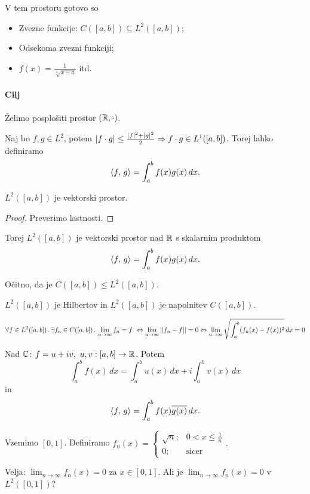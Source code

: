 V tem prostoru gotovo so 
\begin{itemize}
    \item Zvezne funkcije: \(C([a,b]) \subseteq L^2([a,b])\);
    \item Odsekoma zvezni funkciji;
    \item \(f(x) = \frac{1}{\sqrt[4]{x-a}}\) itd.
\end{itemize}

\newpage
\paragraph{Cilj} Želimo posplošiti prostor \((\mathbb{R}, \cdot)\).

Naj bo \(f, g \in L^2\), potem \(|f \cdot g| \leq \frac{|f|^2 + |g|^2}{2} \Rightarrow f \cdot g \in L^1([a, b])\). Torej lahko definiramo 
\[\left\langle f, \, g \right\rangle = \int_{a}^{b}f(x)g(x) \, dx.\]

\begin{trditev}
    \(L^2([a,b])\) je vektorski prostor.
\end{trditev}

\begin{proof}
    Preverimo lastnosti.
\end{proof}

Torej \(L^2([a, b])\) je vektorski prostor nad \(\mathbb{R}\) s skalarnim produktom \[\left\langle f, \, g \right\rangle = \int_{a}^{b}f(x)g(x) \, dx.\]

Očitno, da je \(C([a,b]) \leq L^2([a, b])\).

\begin{izrek}
    \(L^2([a,b])\) je Hilbertov in \(L^2([a,b])\) je napolnitev \(C([a,b])\).
\end{izrek}

\begin{opomba}
    \[\forall f \in L^2([a,b]) \,.\, \exists f_n \in C([a,b]) \,.\, \lim_{n \to \infty}  f_n = f\ \Leftrightarrow \lim_{n \to \infty} ||f_n - f|| = 0 \Leftrightarrow \lim_{n \to \infty} \sqrt{\int_{a}^{b}(f_n(x) - f(x))^2} \, dx = 0\]
\end{opomba}

\begin{opomba}
    Nad \(\mathbb{C}\): \(f = u + iv, \ u, v: [a, b] \to \mathbb{R}\). Potem 
    \[\int_{a}^{b}f(x) \, dx = \int_{a}^{b}u(x) \, dx + i\int_{a}^{b}v(x) \, dx \]
    in 
    \[\left\langle f, \, g \right\rangle = \int_{a}^{b}f(x) \overline{g(x)} \, dx.\]
\end{opomba}

\begin{zgled}
    Vzemimo \([0, 1]\). Definiramo \(f_n(x) = \begin{cases}
        \sqrt{n}; &0 < x \leq \frac{1}{n} \\ 0; &\text{sicer}
    \end{cases}.\)

    Velja: \(\lim_{n \to \infty} f_n(x) = 0\) za \(x \in [0, 1]\). Ali je \(\lim_{n \to \infty} f_n(x) = 0\) v \(L^2([0,1])\)?
\end{zgled}

